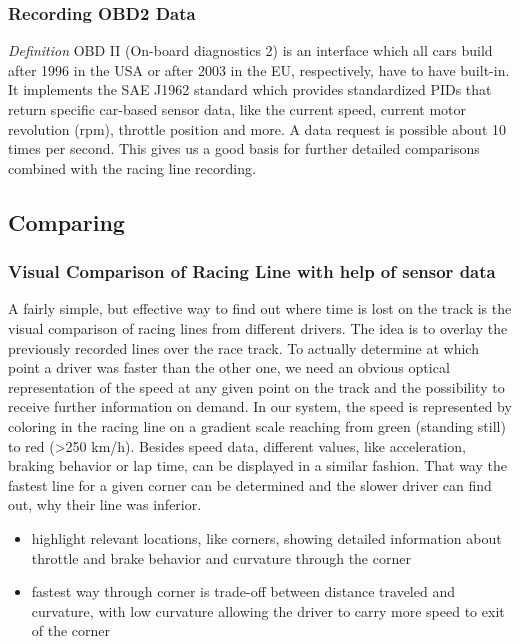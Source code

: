 \subsubsection{Recording OBD2 Data}
\textit{Definition} OBD II (On-board diagnostics 2) is an interface which all cars build after 1996 in the USA or after 2003 in the EU, respectively, have to have built-in. It implements the SAE J1962 standard which provides standardized PIDs that return specific car-based sensor data, like the current speed, current motor revolution (rpm), throttle position and more.
A data request is possible about 10 times per second. This gives us a good basis for further detailed comparisons combined with the racing line recording.

\subsection{Comparing}
\subsubsection{Visual Comparison of Racing Line with help of sensor data}
A fairly simple, but effective way to find out where time is lost on the track is the visual comparison of racing lines from different drivers. The idea is to overlay the previously recorded lines over the race track. To actually determine at which point a driver was faster than the other one, we need an obvious optical representation of the speed at any given point on the track and the possibility to receive further information on demand.
In our system, the speed is represented by coloring in the racing line on a gradient scale reaching from green (standing still) to red (>250 km/h).
Besides speed data, different values, like acceleration, braking behavior or lap time, can be displayed in a similar fashion. That way the fastest line for a given corner can be determined and the slower driver can find out, why their line was inferior.

\begin{itemize}
  \item highlight relevant locations, like corners, showing detailed information about throttle and brake behavior and curvature through the corner
  \item fastest way through corner is trade-off between distance traveled and curvature, with low curvature allowing the driver to carry more speed to exit of the corner
\end{itemize}

